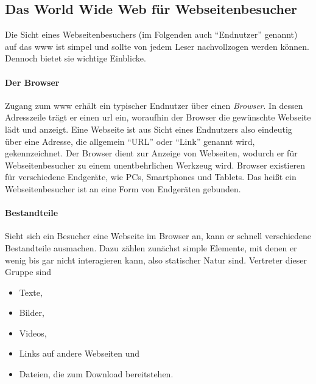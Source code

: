         \subsection{Das World Wide Web für Webseitenbesucher}
            Die Sicht eines Webseitenbesuchers (im Folgenden auch "`Endnutzer"' genannt)
            auf das \gls{www} ist simpel und sollte von jedem Leser nachvollzogen werden können.
            Dennoch bietet sie wichtige Einblicke.

            \paragraph*{Der Browser}
            Zugang zum \gls{www} erhält ein typischer Endnutzer über einen \textit{Browser}.
            In dessen Adresszeile trägt er einen \gls{url} ein,
            woraufhin der Browser die gewünschte Webseite lädt und anzeigt.
            Eine Webseite ist aus Sicht eines Endnutzers also eindeutig über eine
            Adresse, die allgemein "`URL"' oder "`Link"' genannt wird, gekennzeichnet.
            Der Browser dient zur Anzeige von Webseiten, wodurch er für Webseitenbesucher
            zu einem unentbehrlichen Werkzeug wird.
            Browser existieren für verschiedene Endgeräte,
            wie PCs, Smartphones und Tablets.
            Das heißt ein Webseitenbesucher ist an eine Form von Endgeräten gebunden.

            \paragraph*{Bestandteile}
            Sieht sich ein Besucher eine Webseite im Browser an,
            kann er schnell verschiedene Bestandteile ausmachen.
            Dazu zählen zunächst simple Elemente, mit denen er wenig bis gar nicht
            interagieren kann, also statischer Natur sind.
            Vertreter dieser Gruppe sind

            \begin{itemize}
                \item Texte,
                \item Bilder,
                \item Videos,
                \item Links auf andere Webseiten und
                \item Dateien, die zum Download bereitstehen.
            \end{itemize}

